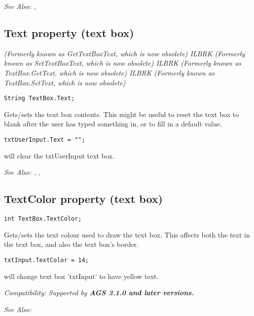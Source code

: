 \it{See Also:} , 


\subsection{Text property (text box)}\label{TextBox.Text}%

\it{(Formerly known as GetTextBoxText, which is now obsolete)} ILBRK
\it{(Formerly known as SetTextBoxText, which is now obsolete)} ILBRK
\it{(Formerly known as TextBox.GetText, which is now obsolete)} ILBRK
\it{(Formerly known as TextBox.SetText, which is now obsolete)}

\begin{verbatim}
String TextBox.Text;
\end{verbatim}

Gets/sets the text box contents. This might be useful to reset
the text box to blank after the user has typed something in, or to fill
in a default value.

\begin{verbatim}
txtUserInput.Text = "";
\end{verbatim}
will clear the txtUserInput text box.

\it{See Also:} ,
,


\subsection{TextColor property (text box)}\label{TextBox.TextColor}%

\begin{verbatim}
int TextBox.TextColor;
\end{verbatim}
Gets/sets the text colour used to draw the text box. This affects both the text in the text
box, and also the text box's border.

\begin{verbatim}
txtInput.TextColor = 14;
\end{verbatim}

will change text box 'txtInput' to have yellow text.

\it{Compatibility:} Supported by \bf{AGS 3.1.0} and later versions.

\it{See Also:} 



